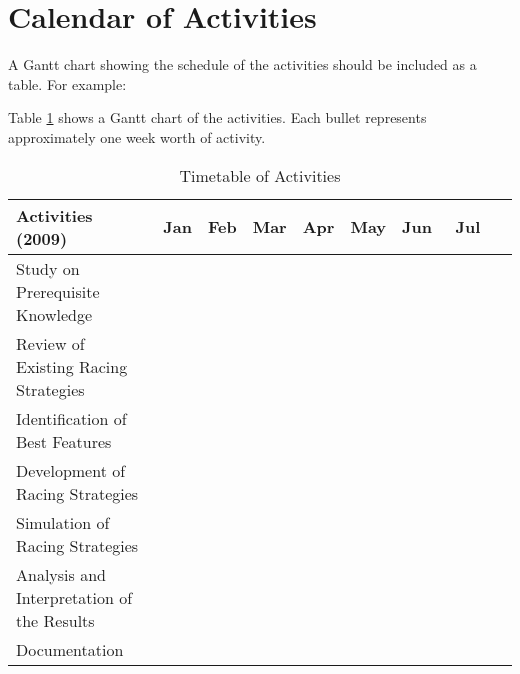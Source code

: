 \section{Calendar of Activities}

A Gantt chart showing the schedule of the activities should be included as a table. For example:

Table \ref{tab:timetableactivities} shows a Gantt chart of the activities.  Each bullet represents approximately
one week worth of activity.

%
%
\newcommand{\weekone}{\textbullet}
\newcommand{\weektwo}{\textbullet \textbullet}
\newcommand{\weekthree}{\textbullet \textbullet \textbullet}
\newcommand{\weekfour}{\textbullet \textbullet \textbullet \textbullet}

%
%
\begin{comment}
   \newcommand{\weekone}{$\star$}
   \newcommand{\weektwo}{$\star \star$}
   \newcommand{\weekthree}{$\star \star \star$}
   \newcommand{\weekfour}{$\star \star \star \star$ }
\end{comment}



\begin{table}[ht!]   %
\centering
\caption{Timetable of Activities} \vspace{0.25cm}
\begin{tabular}{|p{2in}|c|c|c|c|c|c|c|c|} \hline
\centering Activities (2009) & Jan   & Feb & Mar & Apr & May & Jun & Jul \\ \hline
Study on Prerequisite Knowledge      &   &  & ~~~\weektwo & \weekfour &  &  &  \\ \hline
Review of Existing Racing Strategies & ~~~\weektwo  & \weekfour & \weekfour & \weekfour &  &  &  \\ \hline
Identification of Best Features      &   &  &  & \weekfour & \weektwo~~~ &  &  \\ \hline
Development of Racing Strategies     &   &  &  & ~~~\weektwo & \weekfour & \weektwo~~~ &  \\ \hline
Simulation of Racing Strategies      &   &  &  & ~~~\weektwo & \weekfour & \weekthree~~ &  \\ \hline
Analysis and Interpretation of the Results &   &  &  &  & \weekfour & \weekfour & \weekone~~~~~ \\ \hline
Documentation & ~~~\weektwo  & \weekfour & \weekfour & \weekfour & \weekfour & \weekfour & \weektwo~~~ \\ \hline
\end{tabular}
\label{tab:timetableactivities}
\vspace{0.1cm}
\end{table}


